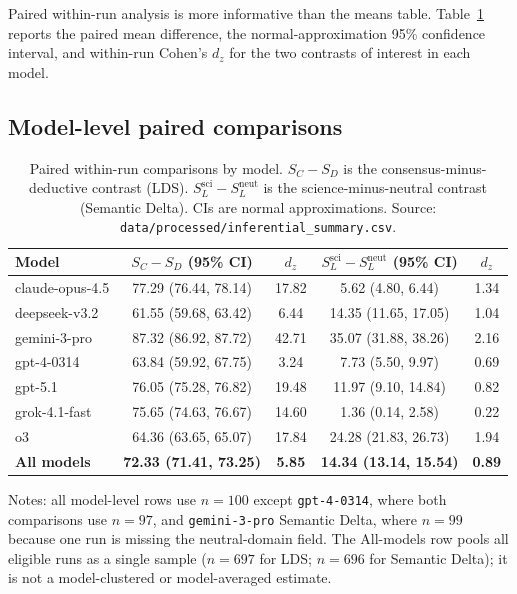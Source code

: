 \documentclass[11pt,letterpaper]{article}
\begin{document}
Paired within-run analysis is more informative than the means table. Table~\ref{tab:paired} reports the paired mean difference, the normal-approximation 95\% confidence interval, and within-run Cohen's $d_z$ for the two contrasts of interest in each model.

\subsection{Model-level paired comparisons}

\begin{table}[ht]
\centering
\caption{Paired within-run comparisons by model. $S_C - S_D$ is the consensus-minus-deductive contrast (LDS). $S_L^{\text{sci}} - S_L^{\text{neut}}$ is the science-minus-neutral contrast (Semantic Delta). CIs are normal approximations. Source: \texttt{data/processed/inferential\_summary.csv}.}
\label{tab:paired}
\small
\begin{tabular}{lcccc}
\toprule
Model & $S_C - S_D$ (95\% CI) & $d_z$ & $S_L^{\text{sci}} - S_L^{\text{neut}}$ (95\% CI) & $d_z$ \\
\midrule
claude-opus-4.5 & 77.29 (76.44, 78.14) & 17.82 & 5.62 (4.80, 6.44) & 1.34 \\
deepseek-v3.2 & 61.55 (59.68, 63.42) & 6.44 & 14.35 (11.65, 17.05) & 1.04 \\
gemini-3-pro & 87.32 (86.92, 87.72) & 42.71 & 35.07 (31.88, 38.26) & 2.16 \\
gpt-4-0314 & 63.84 (59.92, 67.75) & 3.24 & 7.73 (5.50, 9.97) & 0.69 \\
gpt-5.1 & 76.05 (75.28, 76.82) & 19.48 & 11.97 (9.10, 14.84) & 0.82 \\
grok-4.1-fast & 75.65 (74.63, 76.67) & 14.60 & 1.36 (0.14, 2.58) & 0.22 \\
o3 & 64.36 (63.65, 65.07) & 17.84 & 24.28 (21.83, 26.73) & 1.94 \\
\midrule
\textbf{All models} & \textbf{72.33 (71.41, 73.25)} & \textbf{5.85} & \textbf{14.34 (13.14, 15.54)} & \textbf{0.89} \\
\bottomrule
\end{tabular}
\vspace{0.35em}

\footnotesize Notes: all model-level rows use $n=100$ except \texttt{gpt-4-0314}, where both comparisons use $n=97$, and \texttt{gemini-3-pro} Semantic Delta, where $n=99$ because one run is missing the neutral-domain field. The All-models row pools all eligible runs as a single sample ($n=697$ for LDS; $n=696$ for Semantic Delta); it is not a model-clustered or model-averaged estimate.
\end{table}
\end{document}
